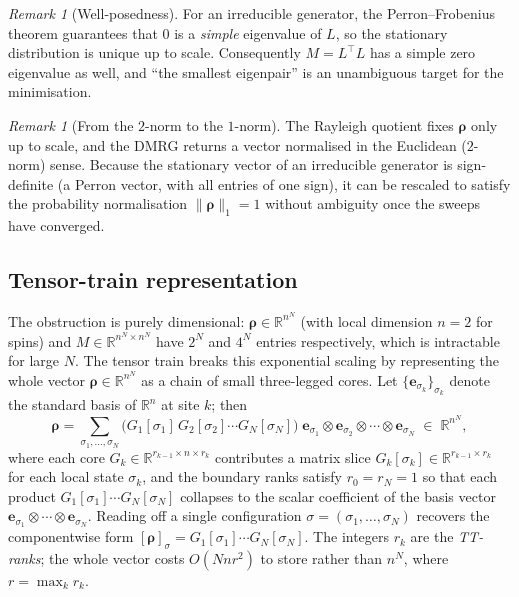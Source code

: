 \documentclass[12pt]{article}
\newcommand{\R}{\mathbb{R}}
\newcommand{\brho}{\boldsymbol{\rho}}
\theoremstyle{definition}
\theoremstyle{remark}
\newtheorem{remark}[theorem]{Remark}
\begin{document}
\begin{remark}[Well-posedness]
For an irreducible generator, the Perron--Frobenius theorem guarantees that $0$ is a \emph{simple} eigenvalue of $L$, so the stationary distribution is unique up to scale. Consequently $M = L^\top L$ has a simple zero eigenvalue as well, and ``the smallest eigenpair'' is an unambiguous target for the minimisation.
\end{remark}

\begin{remark}[From the $2$-norm to the $1$-norm]\label{rem:normalisation}
The Rayleigh quotient fixes $\brho$ only up to scale, and the DMRG returns a vector normalised in the Euclidean ($2$-norm) sense. Because the stationary vector of an irreducible generator is sign-definite (a Perron vector, with all entries of one sign), it can be rescaled to satisfy the probability normalisation $\|\brho\|_1 = 1$ without ambiguity once the sweeps have converged.
\end{remark}

\subsection{Tensor-train representation}\label{sec:tt-rep}

The obstruction is purely dimensional: $\brho \in \R^{n^N}$ (with local dimension $n = 2$ for spins) and $M \in \R^{n^N \times n^N}$ have $2^N$ and $4^N$ entries respectively, which is intractable for large $N$. The tensor train breaks this exponential scaling by representing the whole vector $\brho \in \R^{n^N}$ as a chain of small three-legged cores. Let $\{\mathbf{e}_{\sigma_k}\}_{\sigma_k}$ denote the standard basis of $\R^n$ at site $k$; then
\[
\brho = \sum_{\sigma_1, \dots, \sigma_N}
  \big(G_1[\sigma_1]\, G_2[\sigma_2] \cdots G_N[\sigma_N]\big)\;
  \mathbf{e}_{\sigma_1} \otimes \mathbf{e}_{\sigma_2} \otimes \cdots \otimes \mathbf{e}_{\sigma_N}
  \;\in\; \R^{n^N},
\]
where each core $G_k \in \R^{r_{k-1} \times n \times r_k}$ contributes a matrix slice $G_k[\sigma_k] \in \R^{r_{k-1} \times r_k}$ for each local state $\sigma_k$, and the boundary ranks satisfy $r_0 = r_N = 1$ so that each product $G_1[\sigma_1] \cdots G_N[\sigma_N]$ collapses to the scalar coefficient of the basis vector $\mathbf{e}_{\sigma_1} \otimes \cdots \otimes \mathbf{e}_{\sigma_N}$. Reading off a single configuration $\sigma = (\sigma_1, \dots, \sigma_N)$ recovers the componentwise form $[\brho]_\sigma = G_1[\sigma_1] \cdots G_N[\sigma_N]$. The integers $r_k$ are the \emph{TT-ranks}; the whole vector costs $O(Nnr^2)$ to store rather than $n^N$, where $r = \max_k r_k$.
\end{document}
